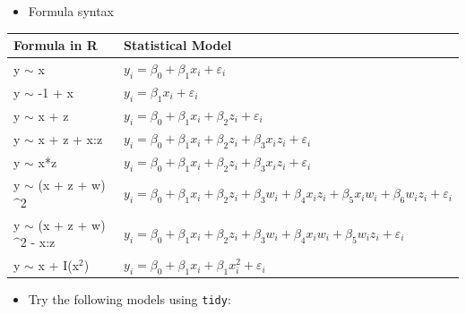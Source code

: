 \documentclass[
  ignorenonframetext,
]{beamer}
\providecommand{\tightlist}{%
  \setlength{\itemsep}{0pt}\setlength{\parskip}{0pt}}\usepackage{longtable,booktabs,array}
\begin{document}
\begin{frame}[fragile]{}
\label{section-42}
\begin{itemize}
\tightlist
\item
  Formula syntax
\end{itemize}

\begin{table}
\centering\begingroup\fontsize{7}{9}\selectfont

\begin{tabular}[t]{ll}
\toprule
Formula in R & Statistical Model\\
\midrule
y $\sim$ x & $y_i = \beta_0 + \beta_1x_i + \varepsilon_i$\\
y $\sim$ -1 + x & $y_i = \beta_1 x_i + \varepsilon_i$\\
y $\sim$ x + z & $y_i = \beta_0 + \beta_1 x_i + \beta_2 z_i + \varepsilon_i$\\
y $\sim$ x + z + x:z & $y_i = \beta_0 + \beta_1 x_i + \beta_2 z_i + \beta_3 x_i z_i + \varepsilon_i$\\
y $\sim$ x*z & $y_i = \beta_0 + \beta_1 x_i + \beta_2 z_i + \beta_3 x_i z_i + \varepsilon_i$\\
y $\sim$ (x + z + w)$\^{}$2 & $y_i = \beta_0 + \beta_1 x_i + \beta_2 z_i + \beta_3 w_i + \beta_4 x_i z_i + \beta_5 x_i w_i + \beta_6 w_i z_i + \varepsilon_i$\\
y $\sim$ (x + z + w)$\^{}$2 - x:z & $y_i = \beta_0 + \beta_1 x_i + \beta_2 z_i + \beta_3 w_i + \beta_4 x_i w_i + \beta_5 w_i z_i + \varepsilon_i$\\
y $\sim$ x + I(x$^2$) & $y_i = \beta_0 + \beta_1x_i + \beta_1x_i^2 + \varepsilon_i$\\
\bottomrule
\end{tabular}
\endgroup{}
\end{table}

\begin{itemize}
\tightlist
\item
  Try the following models using \texttt{tidy}:
\end{itemize}

\tiny


\end{frame}
\end{document}
